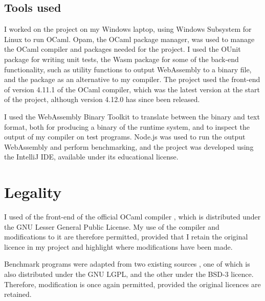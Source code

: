 \subsection{Tools used} %
I worked on the project on my Windows laptop, using Windows Subsystem for Linux to run OCaml. Opam, the OCaml package manager, was used to manage the 
OCaml compiler and packages needed for the project. I used the OUnit package for writing unit tests, the Wasm package for some of the back-end functionality, such as %
utility functions to output WebAssembly to a binary file, and the \jsofocaml{} package as an alternative to my compiler. The project used the front-end of version 4.11.1 of the OCaml compiler, which was the latest version at the start of the project, although version 4.12.0 has since been released. 


I used the WebAssembly Binary Toolkit to translate between the binary and text format, both for producing a binary of the runtime system, and to inspect the output of my compiler on test programs. Node.js was used to run the output WebAssembly and perform benchmarking, and the project was developed using the IntelliJ IDE, available under its educational license.


\section{Legality}
I used of the front-end of the official OCaml compiler \cite{ocaml}, which is distributed under the GNU Lesser General Public License. My use of the compiler and modifications to it are therefore permitted, provided that I retain the original licence in my project and highlight where modifications have been made. 

Benchmark programs were adapted from two existing sources \cite{chris00, benchmark-game}, one of which is also distributed under the GNU LGPL, and the other under the BSD-3 licence. Therefore, modification is once again permitted, provided the original licences are retained.



